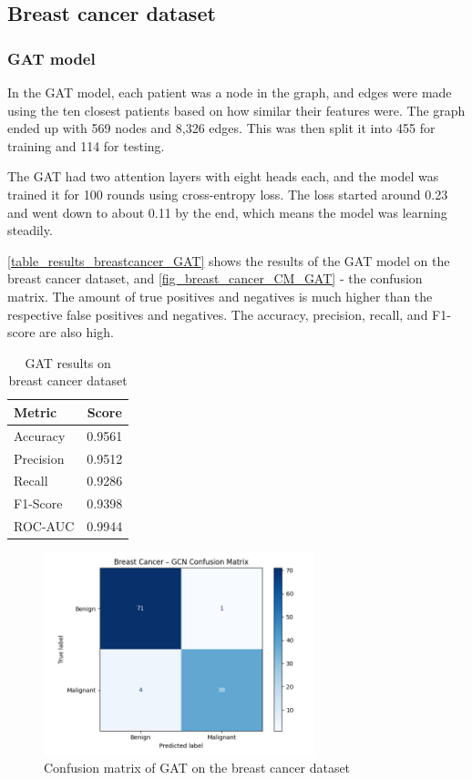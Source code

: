 \documentclass[12pt]{article}
\begin{document}
\subsection{Breast cancer dataset}
\subsubsection{GAT model}

In the GAT model, each patient was a node in the graph, and edges were made using the ten closest patients based on how similar their features were. The graph ended up with 569 nodes and 8,326 edges. This was then split it into 455 for training and 114 for testing.

The GAT had two attention layers with eight heads each, and the model was trained it for 100 rounds using cross-entropy loss. The loss started around 0.23 and went down to about 0.11 by the end, which means the model was learning steadily.


\autoref{table_results_breastcancer_GAT} shows the results of the GAT model on the breast cancer dataset, and \autoref{fig_breast_cancer_CM_GAT} - the confusion matrix. The amount of true positives and negatives is much higher than the respective false positives and negatives. The accuracy, precision, recall, and F1-score are also high.

\begin{table}[H]
\centering
\caption{GAT results on breast cancer dataset}
\begin{tabular}{|l|c|}
\hline
\textbf{Metric} & \textbf{Score} \\
\hline
Accuracy  & 0.9561 \\
Precision & 0.9512 \\
Recall    & 0.9286 \\
F1-Score  & 0.9398 \\
ROC-AUC   & 0.9944 \\
\hline
\end{tabular}
\label{table_results_breastcancer_GAT}
\end{table}

\begin{figure}[H]
    \centering
    \includegraphics[width=0.7\textwidth]{figures/BreastCancer_GAT_CM.png}
    \caption{Confusion matrix of GAT on the breast cancer dataset}
    \label{fig_breast_cancer_CM_GAT}
\end{figure}
\end{document}
